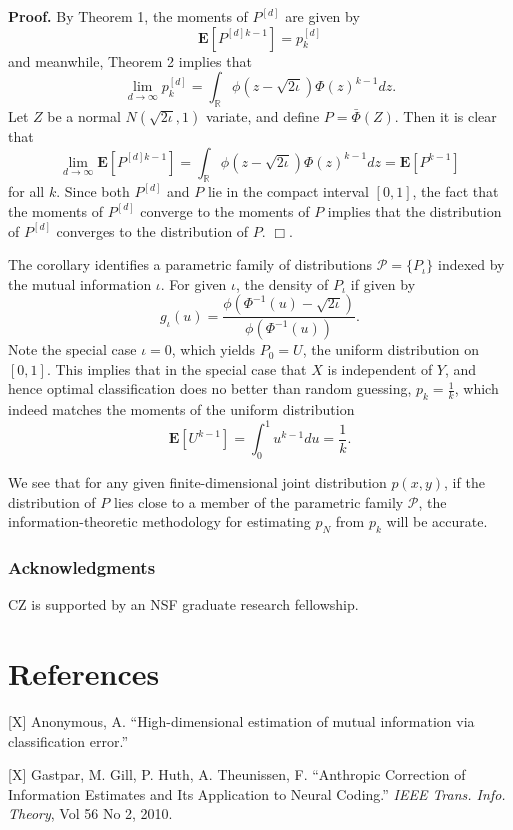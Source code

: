 \documentclass{article}
\newcommand{\E}{\textbf{E}}
\begin{document}
\noindent\textbf{Proof.} By Theorem 1, the moments of $P^{[d]}$ are given by
\[
\E[P^{[d]k-1}] = p_k^{[d]}
\]
and meanwhile, Theorem 2 implies that
\[
\lim_{d \to \infty} p_k^{[d]} = \int_{\mathbb{R}} \phi(z - \sqrt{2\iota}) \Phi(z)^{k-1} dz.
\]
Let $Z$ be a normal $N(\sqrt{2\iota}, 1)$ variate,
and define $P = \bar{\Phi}(Z)$.
Then it is clear that
\[
\lim_{d \to \infty} \E[P^{[d]k-1}] = \int_{\mathbb{R}} \phi(z - \sqrt{2\iota}) \Phi(z)^{k-1} dz = \E[P^{k-1}]
\]
for all $k$.  Since both $P^{[d]}$ and $P$ lie in the compact interval
$[0, 1]$, the fact that the moments of $P^{[d]}$ converge to the
moments of $P$ implies that the distribution of $P^[d]$ converges to
the distribution of $P$. $\Box$.

The corollary identifies a parametric family of distributions
$\mathcal{P} = \{P_\iota\}$ indexed by the mutual information $\iota$.
For given $\iota$, the density of $P_\iota$ if given by
\[
g_\iota(u) = \frac{\phi(\Phi^{-1}(u) - \sqrt{2\iota})}{\phi(\Phi^{-1}(u))}.
\]
Note the special case $\iota = 0$, which yields $P_0 = U$, the uniform
distribution on $[0,1]$.  This implies that in the special case that
$X$ is independent of $Y$, and hence optimal classification does no
better than random guessing, $p_k = \frac{1}{k}$, which indeed matches
the moments of the uniform distribution
\[
\E[U^{k-1}] = \int_0^1 u^{k-1} du = \frac{1}{k}.
\]

We see that for any given finite-dimensional joint distribution $p(x,
y)$, if the distribution of $P$ lies close to a member of the
parametric family $\mathcal{P}$, the information-theoretic methodology
for estimating $p_N$ from $p_k$ will be accurate.

\subsubsection*{Acknowledgments}

CZ is supported by an NSF graduate research fellowship.

\section*{References}

\small

[X] Anonymous, A. ``High-dimensional estimation of mutual information
via classification error.''

[X] Gastpar, M.  Gill, P.  Huth, A.  Theunissen, F. ``Anthropic
Correction of Information Estimates and Its Application to Neural
Coding.'' \emph{IEEE Trans. Info. Theory}, Vol 56 No 2, 2010.
\end{document}
